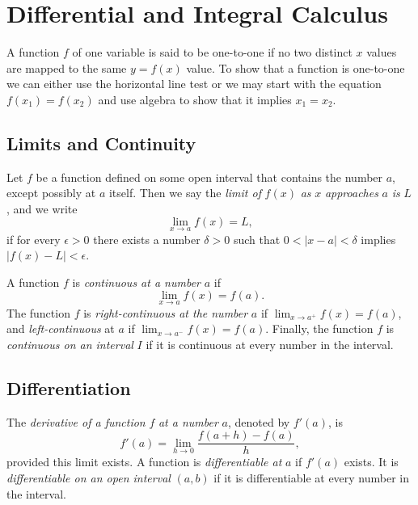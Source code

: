\documentclass[captions=tableheading]{scrbook}
\begin{document}
\section{Differential and Integral Calculus \label{sec:Differential-and-Integral}}
\label{sec-6-2}


A function $f$ of one variable is said to be one-to-one if no two distinct $x$ values are mapped to the same $y=f(x)$ value. To show that a function is one-to-one we can either use the horizontal line test or we may start with the equation $f(x_{1}) = f(x_{2})$ and use algebra to show that it implies $x_{1} = x_{2}$.
\subsection{Limits and Continuity}
\label{sec-6-2-1}

\begin{defn}
Let $f$ be a function defined on some open interval that contains the number $a$, except possibly at $a$ itself. Then we say the \emph{limit of} $f(x)$ \emph{as} $x$ \emph{approaches} $a$ \emph{is} $L$, and we write 
\begin{equation}
\lim_{x \to a}f(x) = L,
\end{equation}
if for every $\epsilon > 0$ there exists a number $\delta > 0$ such that $0 < |x-a| < \delta$ implies $|f(x) - L| < \epsilon$.
\end{defn}

\begin{defn}
A function $f$ is \emph{continuous at a number} $a$ if 
\begin{equation}
\lim_{x \to a} f(x) = f(a).
\end{equation}
The function $f$ is \emph{right-continuous at the number} $a$ if $\lim_{x\to a^{+}}f(x)=f(a)$, and \emph{left-continuous} at $a$ if $\lim_{x\to a^{-}}f(x)=f(a)$. Finally, the function $f$ is \emph{continuous on an interval} $I$ if it is continuous at every number in the interval. 
\end{defn}
\subsection{Differentiation}
\label{sec-6-2-2}

\begin{defn}
The \emph{derivative of a function} $f$ \emph{at a number} $a$, denoted by $f'(a)$, is
\begin{equation}
f'(a)=\lim_{h\to0}\frac{f(a+h)-f(a)}{h},
\end{equation}
provided this limit exists.
A function is \emph{differentiable at} $a$ if $f'(a)$ exists. It is \emph{differentiable on an open interval} $(a,b)$ if it is differentiable at every number in the interval.
\end{defn}
\end{document}
